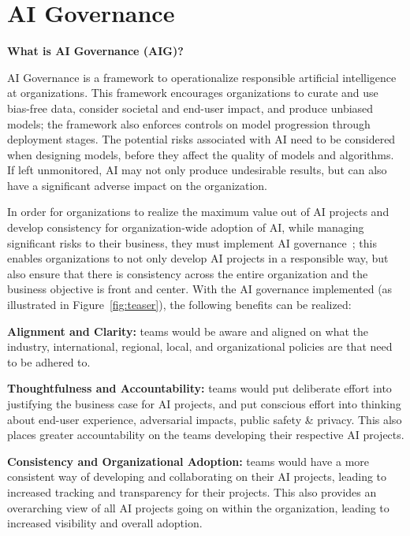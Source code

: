 \documentclass{article}
\begin{document}
\section{AI Governance}

\textbf{What is AI Governance (AIG)?}
\begin{displayquote}

AI Governance is a framework to operationalize responsible artificial intelligence at organizations. This framework encourages organizations to curate and use bias-free data, consider societal and end-user impact, and produce unbiased models; the framework also enforces controls on model progression through deployment stages. The potential risks associated with AI need to be considered when designing models, before they affect the quality of models and algorithms. If left unmonitored, AI may not only produce undesirable results, but can also have a significant adverse impact on the organization.

\end{displayquote}

In order for organizations to realize the maximum value out of AI projects and develop consistency for organization-wide adoption of AI, while managing significant risks to their business, they must implement AI governance~\cite{reddy2020governance, dafoe2018ai, gasser2017layered, kuziemski2020ai}; this enables organizations to not only develop AI projects in a responsible way, but also ensure that there is consistency across the entire organization and the business objective is front and center. With the AI governance implemented (as illustrated in Figure~\ref{fig:teaser}), the following benefits can be realized:

\textbf{Alignment and Clarity:} teams would be aware and aligned on what the industry, international, regional, local, and organizational policies are that need to be adhered to. 

\textbf{Thoughtfulness and Accountability:} teams would put deliberate effort into justifying the business case for AI projects, and put conscious effort into thinking about end-user experience, adversarial impacts, public safety \& privacy. This also places greater accountability on the teams developing their respective AI projects.

\textbf{Consistency and Organizational Adoption:} teams would have a more consistent way of developing and collaborating on their AI projects, leading to increased tracking and transparency for their projects. This also provides an overarching view of all AI projects going on within the organization, leading to increased visibility and overall adoption.
\end{document}
